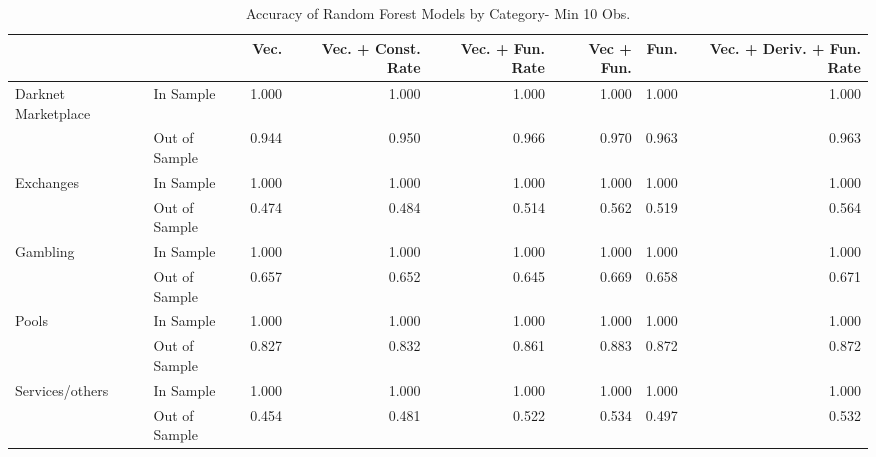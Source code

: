 \begin{table}[ht]
\centering
\begin{tabular}{llrrrrrr}
  \hline
 &  & Vec. & Vec. + Const. Rate & Vec. + Fun. Rate & Vec + Fun. & Fun. & Vec. + Deriv. + Fun. Rate \\ 
  \hline
Darknet Marketplace & In Sample & 1.000 & 1.000 & 1.000 & 1.000 & 1.000 & 1.000 \\ 
   & Out of Sample & 0.944 & 0.950 & 0.966 & 0.970 & 0.963 & 0.963 \\ 
  Exchanges & In Sample & 1.000 & 1.000 & 1.000 & 1.000 & 1.000 & 1.000 \\ 
   & Out of Sample & 0.474 & 0.484 & 0.514 & 0.562 & 0.519 & 0.564 \\ 
  Gambling & In Sample & 1.000 & 1.000 & 1.000 & 1.000 & 1.000 & 1.000 \\ 
   & Out of Sample & 0.657 & 0.652 & 0.645 & 0.669 & 0.658 & 0.671 \\ 
  Pools & In Sample & 1.000 & 1.000 & 1.000 & 1.000 & 1.000 & 1.000 \\ 
   & Out of Sample & 0.827 & 0.832 & 0.861 & 0.883 & 0.872 & 0.872 \\ 
  Services/others & In Sample & 1.000 & 1.000 & 1.000 & 1.000 & 1.000 & 1.000 \\ 
   & Out of Sample & 0.454 & 0.481 & 0.522 & 0.534 & 0.497 & 0.532 \\ 
   \hline
\end{tabular}
\caption{Accuracy of Random Forest Models by Category- Min 10 Obs.} 
\label{rf_10obs_acc_cat}
\end{table}

